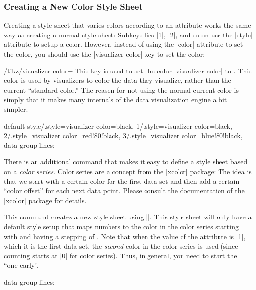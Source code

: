 \subsubsection{Creating a New Color Style Sheet}

Creating a style sheet that varies colors according to an attribute works the
same way as creating a normal style sheet: Subkeys lies |1|, |2|, and so on use
the |style| attribute to setup a color. However, instead of using the |color|
attribute to set the color, you should use the |visualizer color| key to set
the color:

\begin{key}{/tikz/visualizer color=}
    This key is used to set the color |visualizer color| to . This
    color is used by visualizers to color the data they visualize, rather than
    the current ``standard color.'' The reason for not using the normal current
    color is simply that it makes many internals of the data visualization
    engine a bit simpler.
\begin{codeexample}[]
{
  default style/.style={visualizer color=black},
  1/.style={visualizer color=black},
  2/.style={visualizer color=red!80!black},
  3/.style={visualizer color=blue!80!black},
}
\tikz \datavisualization [
  school book axes,
  visualize as line=normal,
  visualize as line=heated,
  visualize as line=critical,
  style sheet=my colors]
data group {lines};
\end{codeexample}
\end{key}

There is an additional command that makes it easy to define a style sheet based
on a \emph{color series}. Color series are a concept from the |xcolor| package:
The idea is that we start with a certain color for the first data set and then
add a certain ``color offset'' for each next data point. Please consult the
documentation of the |xcolor| package for details.

\begin{command}{\tikzdvdeclarestylesheetcolorseries{}}
    This command creates a new style sheet using |\pgfdvdeclarestylesheet|.
    This style sheet will only have a default style setup that maps numbers to
    the color in the color series starting with  and having
    a stepping of . Note that when the value of the attribute is
    |1|, which it is the first data set, the \emph{second} color in the color
    series is used (since counting starts at |0| for color series). Thus, in
    general, you need to start the  ``one early''.
\begin{codeexample}[]
\tikz \datavisualization [
  school book axes,
  visualize as line=normal,
  visualize as line=heated,
  visualize as line=critical,
  style sheet=greens]
data group {lines};
\end{codeexample}
\end{command}


